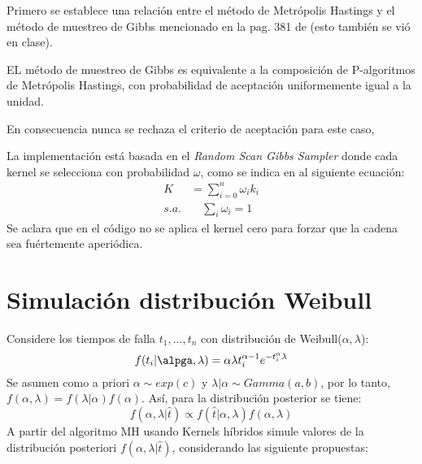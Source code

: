 \documentclass[preprint,12pt]{elsarticle}
\newenvironment{theorem}[2][Theorem]{\begin{trivlist}
\item[\hskip \labelsep {\bfseries #1}\hskip \labelsep {\bfseries #2.}]}{\end{trivlist}}
\begin{document}
Primero se establece una relación entre el método de Metrópolis Hastings y el método de muestreo de Gibbs mencionado en la pag. 381 de \cite{robert2010introducing} (esto también se vió en clase).

\begin{theorem} 1
EL método de muestreo de Gibbs es equivalente a la composición de P-algoritmos  de Metrópolis Hastings, con probabilidad de aceptación uniformemente igual a la unidad.
\end{theorem}
 
En consecuencia nunca se rechaza el criterio de aceptación para este caso,

La implementación está basada en el \textit{Random Scan Gibbs Sampler} donde cada kernel se selecciona con probabilidad $\omega$, como se indica en al siguiente ecuación:
\begin{equation}
\begin{split}
    K &= \sum_{i=0}^n \omega_i k_i \\
    s.a. & \quad \sum_i \omega_i = 1
\end{split}
\end{equation}
Se aclara que en el código no se aplica el kernel cero para forzar que la cadena sea fuértemente aperiódica.
%



\section{Simulación distribución Weibull}
Considere los tiempos de falla $t_1, ..., t_n$ con distribución de Weibull($\alpha, \lambda$):
\begin{equation}
    f(t_i | \alpga, \lambda) = \alpha \lambda t_i^{\alpha-1} e^{-t_i^\alpha \lambda}
\end{equation}
Se asumen como a priori $\alpha \sim exp(c)$ y $\lambda | \alpha \sim Gamma(a, b)$, por lo tanto, $f(\alpha, \lambda) = f(\lambda | \alpha) f(\alpha)$.
%
Así, para la distribución posterior se tiene:
\begin{equation}
    f(\alpha, \lambda | \hat{t}) \propto f(\hat{t} | \alpha, \lambda) f(\alpha, \lambda)
\end{equation}
A partir del algoritmo MH usando Kernels híbridos simule valores de la distribución posteriori $f(\alpha, \lambda | \hat{t})$, considerando las siguiente propuestas:
\end{document}
